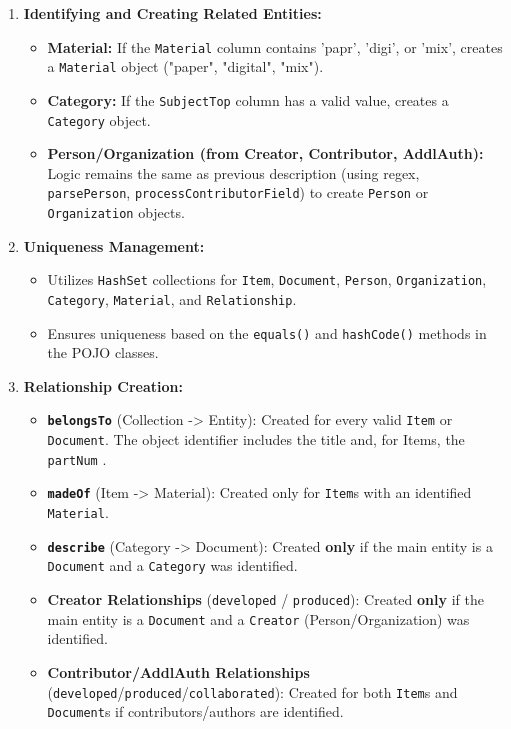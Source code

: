 \documentclass[11pt, a4paper]{article}
\begin{document}
\begin{enumerate}
    \item \textbf{Identifying and Creating Related Entities:}
        \begin{itemize}
            \item \textbf{Material:} If the \texttt{Material} column contains 'papr', 'digi', or 'mix', creates a \texttt{Material} object ("paper", "digital", "mix").
            \item \textbf{Category:} If the \texttt{SubjectTop} column has a valid value, creates a \texttt{Category} object.
            \item \textbf{Person/Organization (from Creator, Contributor, AddlAuth):} Logic remains the same as previous description (using regex, \texttt{parsePerson}, \texttt{processContributorField}) to create \texttt{Person} or \texttt{Organization} objects.
        \end{itemize}

    \item \textbf{Uniqueness Management:}
        \begin{itemize}
            \item Utilizes \texttt{HashSet} collections for \texttt{Item}, \texttt{Document}, \texttt{Person}, \texttt{Organization}, \texttt{Category}, \texttt{Material}, and \texttt{Relationship}.
            \item Ensures uniqueness based on the \texttt{equals()} and \texttt{hashCode()} methods in the POJO classes.
        \end{itemize}

    \item \textbf{Relationship Creation:}
        \begin{itemize}
            \item \textbf{\texttt{belongsTo}} (Collection -> Entity): Created for every valid \texttt{Item} or \texttt{Document}. The object identifier includes the title and, for Items, the \texttt{partNum} .
            \item \textbf{\texttt{madeOf}} (Item -> Material): Created only for \texttt{Item}s with an identified \texttt{Material}.
            \item \textbf{\texttt{describe}} (Category -> Document): Created \textbf{only} if the main entity is a \texttt{Document} and a \texttt{Category} was identified.
            \item \textbf{Creator Relationships} (\texttt{developed} / \texttt{produced}): Created \textbf{only} if the main entity is a \texttt{Document} and a \texttt{Creator} (Person/Organization) was identified.
            \item \textbf{Contributor/AddlAuth Relationships} (\texttt{developed}/\texttt{produced}/\texttt{collaborated}): Created for both \texttt{Item}s and \texttt{Document}s if contributors/authors are identified.
        \end{itemize}


\end{enumerate}
\end{document}
